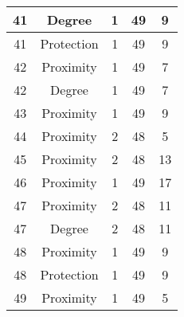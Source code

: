 \documentclass[results.tex]{subfiles}
\begin{document}
\begin{center}
\begin{tabular}{| c || c | c | c | c |}
            \hline
            41                      & Degree                       & 1                      & 49                      & 9                    \\
            \hline
            41                      & Protection                   & 1                      & 49                      & 9                    \\
            \hline
            42                      & Proximity                    & 1                      & 49                      & 7                    \\
            \hline
            42                      & Degree                       & 1                      & 49                      & 7                    \\
            \hline
            43                      & Proximity                    & 1                      & 49                      & 9                    \\
            \hline
            44                      & Proximity                    & 2                      & 48                      & 5                    \\
            \hline
            45                      & Proximity                    & 2                      & 48                      & 13                   \\
            \hline
            46                      & Proximity                    & 1                      & 49                      & 17                   \\
            \hline
            47                      & Proximity                    & 2                      & 48                      & 11                   \\
            \hline
            47                      & Degree                       & 2                      & 48                      & 11                   \\
            \hline
            48                      & Proximity                    & 1                      & 49                      & 9                    \\
            \hline
            48                      & Protection                   & 1                      & 49                      & 9                    \\
            \hline
            49                      & Proximity                    & 1                      & 49                      & 5                    \\
            \hline
        \end{tabular}
    \end{center}
\end{document}
